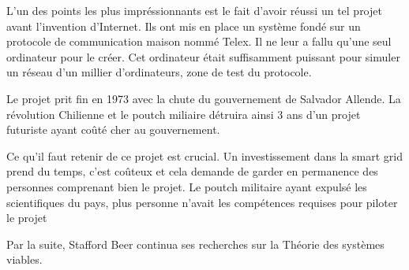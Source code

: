 L'un des points les plus impréssionnants est le fait d'avoir réussi un tel projet avant
l'invention d'Internet. Ils ont mis en place un système fondé sur un protocole de communication maison nommé Telex.
Il ne leur a fallu qu'une seul ordinateur pour le créer. Cet ordinateur était suffisamment puissant pour
simuler un réseau d'un millier d'ordinateurs, zone de test du protocole.

Le projet prit fin en 1973 avec la chute du gouvernement de Salvador Allende.
La révolution Chilienne et le poutch miliaire détruira ainsi 3 ans d'un projet futuriste ayant
coûté cher au gouvernement.

Ce qu'il faut retenir de ce projet est crucial. Un investissement dans la smart grid prend du temps,
c'est coûteux et cela demande de garder en permanence des personnes comprenant bien le projet.
Le poutch militaire ayant expulsé les scientifiques du pays, plus personne n'avait les compétences
requises pour piloter le projet

Par la suite, Stafford Beer continua ses recherches sur la Théorie des systèmes viables.













